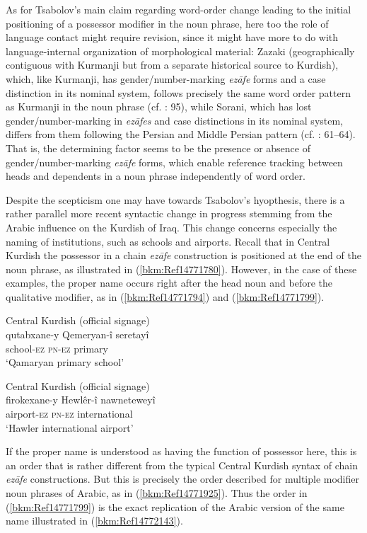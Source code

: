 \documentclass[output=paper]{langsci/langscibook}
\begin{document}
As for Tsabolov’s main claim regarding word-order change leading to the initial positioning of a possessor modifier in the noun phrase, here too the role of language contact might require revision, since it might have more to do with language-internal organization of morphological material: Zazaki (geographically contiguous with Kurmanji but from a separate historical source to Kurdish), which, like Kurmanji, has gender/number-marking \textit{ezāfe} forms and a case distinction in its nominal system, follows precisely the same word order pattern as Kurmanji in the noun phrase (cf. \citealt{Todd2002}: 95), while Sorani, which has lost gender/number-marking in \textit{ezāfes} and case distinctions in its nominal system, differs from them following the Persian and Middle Persian pattern (cf. \citealt{Öpengin2016}: 61–64). That is, the determining factor seems to be the presence or absence of gender/number-marking \textit{ezāfe} forms, which enable reference tracking between heads and dependents in a noun phrase independently of word order.   

Despite the scepticism one may have towards Tsabolov’s hyopthesis, there is a rather parallel more recent syntactic change in progress stemming from the Arabic influence on the Kurdish of Iraq. This change concerns especially the naming of institutions, such as schools and airports. Recall that in Central Kurdish the possessor in a chain \textit{ezāfe} construction is positioned at the end of the noun phrase, as illustrated in (\ref{bkm:Ref14771780}). However, in the case of these examples, the proper name occurs right after the head noun and before the qualitative modifier, as in (\ref{bkm:Ref14771794}) and (\ref{bkm:Ref14771799}). 

\ea\label{bkm:Ref14771794}Central Kurdish (official signage)\\
\gll qutabxane-y Qemeryan-î seretayî\\
     school-\textsc{ez} \textsc{pn-ez} primary\\
\glt ‘Qamaryan primary school’
\z

\ea\label{bkm:Ref14771799}Central Kurdish (official signage)\\
\gll firokexane-y Hewlêr-î nawneteweyî\\
     airport-\textsc{ez} \textsc{pn-ez} international\\
\glt ‘Hawler international airport’
\z

If the proper name is understood as having the function of possessor here, this is an order that is rather different from the typical Central Kurdish syntax of chain \textit{ezāfe} constructions. But this is precisely the order described for multiple modifier noun phrases of Arabic, as in (\ref{bkm:Ref14771925}). Thus the order in (\ref{bkm:Ref14771799}) is the exact replication of the Arabic version of the same name illustrated in (\ref{bkm:Ref14772143}).
\end{document}
